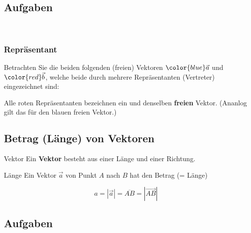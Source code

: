 \subsection*{Aufgaben}\

\newpage



\subsubsection{Repräsentant}
Betrachten Sie die beiden folgenden (freien) Vektoren ${\color{blue} \vec{a}}$ und
${\color{red}\vec{b}}$, welche beide durch mehrere Repräsentanten
(Vertreter\index{Vertreter!Vektor}) eingezeichnet sind:


Alle {\color{red} roten} Repräsentanten bezeichnen ein und denselben
\textbf{freien} Vektor. (Ananlog gilt das für den {\color{blue} blauen} freien Vektor.)

\newpage


\subsection{Betrag (Länge) von Vektoren}



\begin{definition}{Vektor}{}
  Ein \textbf{Vektor} besteht aus einer Länge und einer Richtung.
\end{definition}


    \begin{definition}{Länge}{}
      Ein Vektor $\vec{a}$ von Punkt $A$ nach $B$ hat den Betrag (= Länge)

      $$a = |\vec{a}| = \overline{AB} = \left|\overrightarrow{AB}\right|$$
    \end{definition}


\subsection*{Aufgaben}\

\newpage
